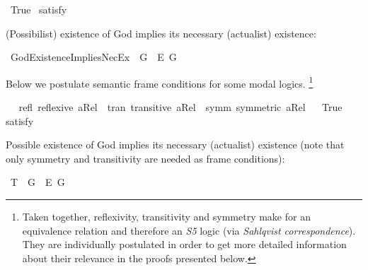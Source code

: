 \begin{isabellebody}
\isanewline
{}\isamarkupfalse%
\ True\ \isamarkupfalse%
{\isacharbrackleft}satisfy{\isacharbrackright}%
\ %
%
\isamarkupfalse%
\ %
%
%
%
%
\begin{isamarkuptext}%
(Possibilist) existence of God implies its necessary (actualist) existence:%
\end{isamarkuptext}\isamarkuptrue%
\isamarkupfalse%
\ GodExistenceImpliesNecEx{\isacharcolon}\ {\isachardoublequoteopen}{\isasymlfloor}\isactrlbold {\isasymexists}\ G\ \isactrlbold {\isasymrightarrow}\ \isactrlbold {\isasymbox}\isactrlbold {\isasymexists}\isactrlsup E\ G{\isasymrfloor}{\isachardoublequoteclose}%
\ %
%
\isamarkupfalse%
\ {\isacharminus}\ %
%
%
%
%
\begin{isamarkuptext}%
Below we postulate semantic frame conditions for some modal logics. \footnote{Taken together, reflexivity, transitivity and symmetry
 make for an equivalence relation and therefore an \emph{S5} logic (via \emph{Sahlqvist correspondence}).
 They are individually postulated in order to get more detailed information about their relevance in the proofs presented below.}%
\end{isamarkuptext}\isamarkuptrue%
\isamarkupfalse%
\ \isanewline
\ refl{\isacharcolon}\ {\isachardoublequoteopen}reflexive\ aRel{\isachardoublequoteclose}\ \ tran{\isacharcolon}\ {\isachardoublequoteopen}transitive\ aRel{\isachardoublequoteclose}\ \ symm{\isacharcolon}\ {\isachardoublequoteopen}symmetric\ aRel{\isachardoublequoteclose}\isanewline
\ \isanewline
{}\isamarkupfalse%
\ True\ \isamarkupfalse%
{\isacharbrackleft}satisfy{\isacharbrackright}%
\ %
%
\isamarkupfalse%
\ %
%
%
%
%
%
%
%
%
%
%
%
%
%
%
%
%
\begin{isamarkuptext}%
Possible existence of God implies its necessary (actualist) existence (note that only symmetry and
transitivity are needed as frame conditions):%
\end{isamarkuptext}\isamarkuptrue%
\isamarkupfalse%
\ T{}{\isacharcolon}\ {\isachardoublequoteopen}{\isasymlfloor}\isactrlbold {\isasymdiamond}\isactrlbold {\isasymexists}\ G{\isasymrfloor}\ {\isasymlongrightarrow}\ {\isasymlfloor}\isactrlbold {\isasymbox}\isactrlbold {\isasymexists}\isactrlsup E\ G{\isasymrfloor}{\isachardoublequoteclose}%

\end{isabellebody}
